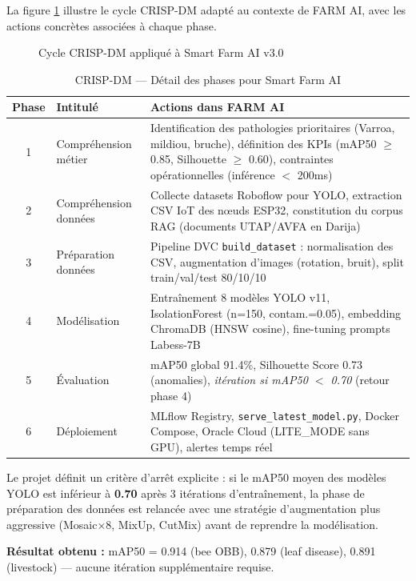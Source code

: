 La figure \ref{fig:crisp_dm} illustre le cycle CRISP-DM adapté au contexte de FARM AI,
avec les actions concrètes associées à chaque phase.

\begin{figure}[H]
\centering

\caption{Cycle CRISP-DM appliqué à Smart Farm AI v3.0}
\label{fig:crisp_dm}
\end{figure}

\begin{table}[H]
\centering
\caption{CRISP-DM — Détail des phases pour Smart Farm AI}
\label{tab:crisp_dm_detail}
\begin{tabular}{clp{8.5cm}}
\toprule
\textbf{Phase} & \textbf{Intitulé} & \textbf{Actions dans FARM AI} \\
\midrule
1 & Compréhension métier &
  Identification des pathologies prioritaires (Varroa, mildiou, bruche),
  définition des KPIs (mAP50 $\geq$ 0.85, Silhouette $\geq$ 0.60),
  contraintes opérationnelles (inférence $<$ 200ms) \\
2 & Compréhension données &
  Collecte datasets Roboflow pour YOLO, extraction CSV IoT des nœuds ESP32,
  constitution du corpus RAG (documents UTAP/AVFA en Darija) \\
3 & Préparation données &
  Pipeline DVC \texttt{build\_dataset} : normalisation des CSV, augmentation
  d'images (rotation, bruit), split train/val/test 80/10/10 \\
4 & Modélisation &
  Entraînement 8 modèles YOLO v11, IsolationForest (n=150, contam.=0.05),
  embedding ChromaDB (HNSW cosine), fine-tuning prompts Labess-7B \\
5 & Évaluation &
  mAP50 global 91.4\%, Silhouette Score 0.73 (anomalies),
  \textit{itération si mAP50 $<$ 0.70} (retour phase 4) \\
6 & Déploiement &
  MLflow Registry, \texttt{serve\_latest\_model.py}, Docker Compose,
  Oracle Cloud (LITE\_MODE sans GPU), alertes temps réel \\
\bottomrule
\end{tabular}
\end{table}

\begin{tcolorbox}[technote, title={Critère d'arrêt des itérations CRISP-DM}]
Le projet définit un critère d'arrêt explicite : si le mAP50 moyen des modèles YOLO
est inférieur à \textbf{0.70} après 3 itérations d'entraînement, la phase de
préparation des données est relancée avec une stratégie d'augmentation plus aggressive
(Mosaic×8, MixUp, CutMix) avant de reprendre la modélisation.

\medskip
\textbf{Résultat obtenu :} mAP50 = 0.914 (bee OBB), 0.879 (leaf disease), 0.891
(livestock) — aucune itération supplémentaire requise.
\end{tcolorbox}
